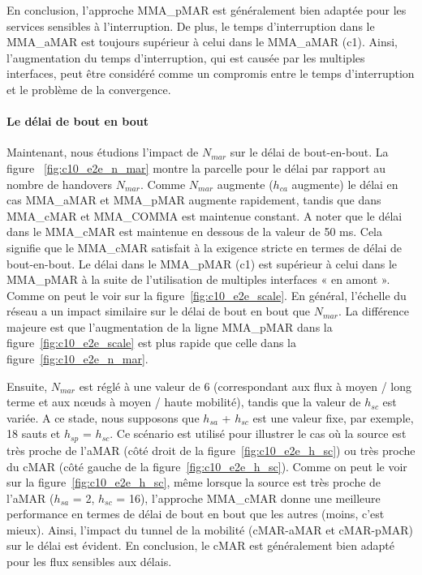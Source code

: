 En conclusion, l'approche MMA\_pMAR est généralement bien adaptée pour les services sensibles à l'interruption. De plus, le temps d'interruption dans le MMA\_aMAR est toujours supérieur à celui dans le MMA\_aMAR (c1). Ainsi, l'augmentation du temps d'interruption, qui est causée par les multiples interfaces, peut être considéré comme un compromis entre le temps d'interruption et le problème de la convergence.

\paragraph{Le délai de bout en bout}
Maintenant, nous étudions l'impact de $ N_{mar} $ sur le délai de bout-en-bout. La figure ~\ref {fig:c10_e2e_n_mar} montre la parcelle pour le délai par rapport au nombre de handovers $ N_{mar} $. Comme $ N_{mar} $ augmente ($h_ {ca} $ augmente) le délai en cas MMA\_aMAR et MMA\_pMAR augmente rapidement, tandis que dans MMA\_cMAR et MMA\_COMMA est maintenue constant. A noter que le délai dans le MMA\_cMAR est maintenue en dessous de la valeur de 50 ms. Cela signifie que le MMA\_cMAR satisfait à la exigence stricte en termes de délai de bout-en-bout. Le délai dans le MMA\_pMAR (c1) est supérieur à celui dans le MMA\_pMAR à la suite de l'utilisation de multiples interfaces « en amont ». Comme on peut le voir sur la figure~\ref{fig:c10_e2e_scale}. En général, l'échelle du réseau a un impact similaire sur le délai de bout en bout que $ N_{mar} $. La différence majeure est que l'augmentation de la ligne MMA\_pMAR dans la figure~\ref{fig:c10_e2e_scale} est plus rapide que celle dans la figure~\ref{fig:c10_e2e_n_mar}.


Ensuite, $ N_{mar} $ est réglé à une valeur de 6 (correspondant aux flux à moyen / long terme et aux nœuds à moyen / haute mobilité), tandis que la valeur de $ h_ {sc} $ est variée. A ce stade, nous supposons que $h_{sa}$ + $h_{sc} $ est une valeur fixe, par exemple, 18 sauts et $ h_{sp} $ = $ h_{sc} $. Ce scénario est utilisé pour illustrer le cas où la source est très proche de l'aMAR (côté droit de la figure~\ref {fig:c10_e2e_h_sc}) ou  très proche du cMAR (côté gauche de la figure~\ref {fig:c10_e2e_h_sc}). Comme on peut le voir sur la figure~\ref {fig:c10_e2e_h_sc}, même lorsque la source est très proche de l'aMAR ($ h_{sa} $ = 2, $ h_{sc} $ = 16), l'approche MMA\_cMAR donne une meilleure performance en termes de délai de bout en bout que les autres (moins, c'est mieux). Ainsi, l'impact du tunnel de la mobilité (cMAR-aMAR et cMAR-pMAR) sur le délai est évident. En conclusion, le cMAR est généralement bien adapté pour les flux sensibles aux délais.

